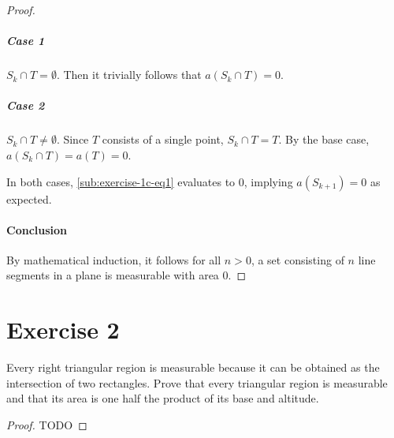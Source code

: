 \documentclass{article}
\begin{document}
\begin{proof}
    \subparagraph{Case 1}%

      $S_k \cap T = \emptyset$.
      Then it trivially follows that $a(S_k \cap T) = 0$.

    \subparagraph{Case 2}%

      $S_k \cap T \neq \emptyset$.
      Since $T$ consists of a single point, $S_k \cap T = T$.
      By the base case, $a(S_k \cap T) = a(T) = 0$.

    \vspace{8pt}
    \noindent
    In both cases, \eqref{sub:exercise-1c-eq1} evaluates to $0$, implying
      $a(S_{k+1}) = 0$ as expected.

  \paragraph{Conclusion}%

    By mathematical induction, it follows for all $n > 0$, a set consisting of
    $n$ line segments in a plane is measurable with area $0$.

\end{proof}

\section{Exercise 2}%
\label{sec:exercise-2}

Every right triangular region is measurable because it can be obtained as the
intersection of two rectangles. Prove that every triangular region is measurable
and that its area is one half the product of its base and altitude.

\begin{proof}

  TODO

\end{proof}
\end{document}
